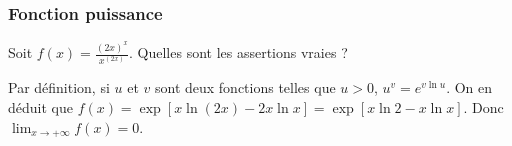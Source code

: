 \subsubsection{Fonction puissance}


\begin{question} 
Soit  $f(x)=\frac{(2x)^x}{x^{(2x)}}$. Quelles sont les assertions vraies ?
\begin{answers}

    
       
    

\end{answers}
\begin{explanations}
Par définition, si $u$ et $v$ sont deux fonctions telles  que $u>0$, $u^v=e^{v\ln u}$. On en déduit que $f(x)=\exp[ x\ln (2x )- 2x\ln x] =  \exp[ x\ln 2 - x\ln x]$. Donc $\lim_{x\to +\infty } f(x)=0$.
\end{explanations}

\end{question}









